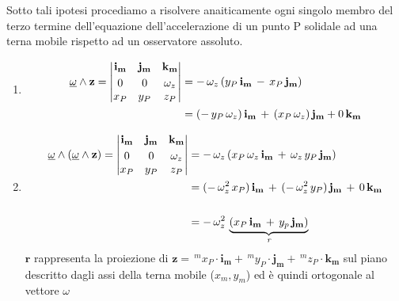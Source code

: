 		Sotto tali ipotesi procediamo a risolvere anaiticamente ogni singolo membro del terzo termine  dell'equazione dell'accelerazione di un punto P solidale ad una terna mobile rispetto ad un osservatore assoluto.
		
		\begin{enumerate}
			\item
				 \begin{equation*}
				 	\begin{split}
				 		\underline{\omega} \wedge \mathbf{z} =	\begin{vmatrix}
				 				\mathbf{i_m} & \mathbf{j_m} & \mathbf{k_m}\vspace{1mm}\\
				 				0 & 0 & \omega_z\\
				 				x_P & y_P & z_P\\
				 			\end{vmatrix}
				 			&= - \, \omega_z \, (y_P \, \mathbf{i_m} \, - \, x_P \, \mathbf{j_m})\\
				 			&= (-\, y_P\, \omega_z ) \, \mathbf{i_m} \, + \, (x_P \, \omega_z) \, \mathbf{j_m} + 0 \, \mathbf{k_m}\\
				  	\end{split}
				  \end{equation*}
				  
				  \item
				  	\begin{equation*}
				  		\begin{split}
				  			\underline{\omega} \wedge (\underline{\omega} \wedge \mathbf{z}) =
				  				\begin{vmatrix}
				  					\mathbf{i_m} & \mathbf{j_m} & \mathbf{k_m}\vspace{1mm}\\
				  					0 & 0 & \omega_z\\
				  					x_P & y_P & z_P\\
				  				\end{vmatrix}
				  				&= -\, \omega_z \,(x_P \, \omega_z \, \mathbf{i_m} \, + \, \omega_z \, y_P \, \mathbf{j_m})\\
				  				&= (-\, \omega_z^2 \, x_P) \, \mathbf{i_m} \, + \, (-\, \omega_z^2 \, y_P) \, \mathbf{j_m} \, + \, 0\, \mathbf{k_m}\\
\\
				  				&= -\, \omega_z^2 \, \underbrace{(x_P \, \mathbf{i_m} \, +\, y_p \, \mathbf{j_m})}_{ \mathbf{\emph{r}}}
						\end{split}
				  	\end{equation*}
				  	$\mathbf{r}$ \hspace{3mm} rappresenta la proiezione di $\mathbf{z}  = \,^mx_P \cdot \mathbf{i_m} + \,^my_P \cdot \mathbf{j_m} +\,^mz_P \cdot \mathbf{k_m} $ sul piano descritto dagli assi della terna mobile ($x_m , y_m$) ed è quindi ortogonale al vettore $\omega$
		\end{enumerate}
		
